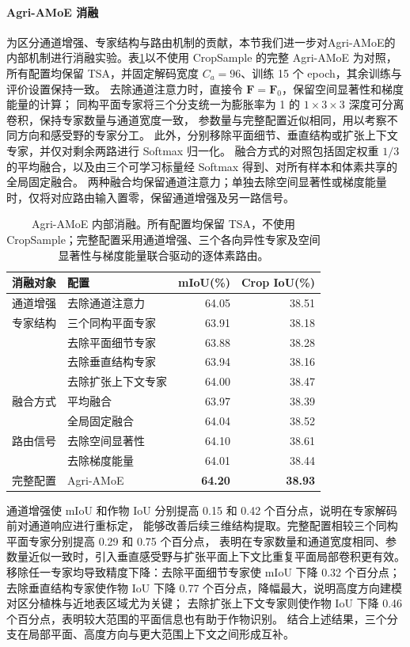 \documentclass[a4paper,fleqn]{cas-sc}
\begin{document}
\paragraph{Agri-AMoE 消融}
为区分通道增强、专家结构与路由机制的贡献，本节我们进一步对Agri-AMoE的内部机制进行消融实验。表\ref{tab:amoe_router}以不使用 CropSample 的完整 Agri-AMoE 为对照，
所有配置均保留 TSA，并固定解码宽度 $C_a=96$、训练 15 个 epoch，其余训练与评价设置保持一致。
去除通道注意力时，直接令 $\bm F=\bm F_0$，保留空间显著性和梯度能量的计算；
同构平面专家将三个分支统一为膨胀率为 1 的 $1\times3\times3$ 深度可分离卷积，保持专家数量与通道宽度一致，
参数量与完整配置近似相同，用以考察不同方向和感受野的专家分工。
此外，分别移除平面细节、垂直结构或扩张上下文专家，并仅对剩余两路进行 Softmax 归一化。
融合方式的对照包括固定权重 $1/3$ 的平均融合，以及由三个可学习标量经 Softmax 得到、对所有样本和体素共享的全局固定融合。
两种融合均保留通道注意力；单独去除空间显著性或梯度能量时，仅将对应路由输入置零，保留通道增强及另一路信号。

\begin{table}[pos=htbp]
\centering
\caption{Agri-AMoE 内部消融。所有配置均保留 TSA，不使用 CropSample；完整配置采用通道增强、三个各向异性专家及空间显著性与梯度能量联合驱动的逐体素路由。}
\label{tab:amoe_router}
\begin{tabular}{llrr}
\toprule
消融对象 & 配置 & mIoU(\%) & Crop IoU(\%)\\
\midrule
通道增强 & 去除通道注意力 & 64.05 & 38.51\\
\midrule
专家结构 & 三个同构平面专家 & 63.91 & 38.18\\
 & 去除平面细节专家 & 63.88 & 38.28\\
 & 去除垂直结构专家 & 63.94 & 38.16\\
 & 去除扩张上下文专家 & 64.00 & 38.47\\
\midrule
融合方式 & 平均融合 & 63.97 & 38.39\\
 & 全局固定融合 & 64.04 & 38.52\\
\midrule
路由信号 & 去除空间显著性 & 64.10 & 38.61\\
 & 去除梯度能量 & 64.01 & 38.44\\
\midrule
完整配置 & Agri-AMoE & \textbf{64.20} & \textbf{38.93}\\
\bottomrule
\end{tabular}
\end{table}

通道增强使 mIoU 和作物 IoU 分别提高 0.15 和 0.42 个百分点，说明在专家解码前对通道响应进行重标定，
能够改善后续三维结构提取。完整配置相较三个同构平面专家分别提高 0.29 和 0.75 个百分点，
表明在专家数量和通道宽度相同、参数量近似一致时，引入垂直感受野与扩张平面上下文比重复平面局部卷积更有效。
移除任一专家均导致精度下降：去除平面细节专家使 mIoU 下降 0.32 个百分点；
去除垂直结构专家使作物 IoU 下降 0.77 个百分点，降幅最大，说明高度方向建模对区分植株与近地表区域尤为关键；
去除扩张上下文专家则使作物 IoU 下降 0.46 个百分点，表明较大范围的平面信息也有助于作物识别。
结合上述结果，三个分支在局部平面、高度方向与更大范围上下文之间形成互补。
\end{document}
